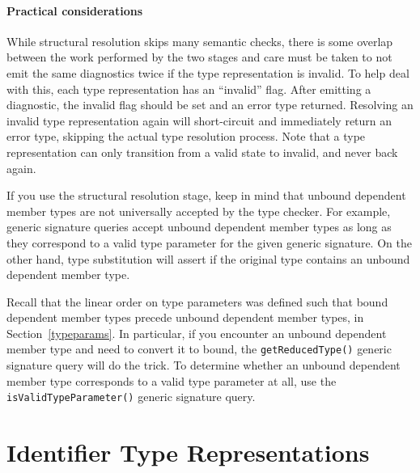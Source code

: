 \documentclass[../generics]{subfiles}
\begin{document}
\paragraph{Practical considerations}
While structural resolution skips many semantic checks, there is some overlap between the work performed by the two stages and care must be taken to not emit the same diagnostics twice if the type representation is invalid. To help deal with this, each type representation has an ``invalid'' flag. After emitting a diagnostic, the invalid flag should be set and an error type returned. Resolving an invalid type representation again will short-circuit and immediately return an error type, skipping the actual type resolution process. Note that a type representation can only transition from a valid state to invalid, and never back again.

If you use the structural resolution stage, keep in mind that unbound dependent member types are not universally accepted by the type checker. For example, generic signature queries accept unbound dependent member types as long as they correspond to a valid type parameter for the given generic signature. On the other hand, type substitution will assert if the original type contains an unbound dependent member type.

Recall that the linear order on type parameters was defined such that bound dependent member types precede unbound dependent member types, in Section~\ref{typeparams}. In particular, if you encounter an unbound dependent member type and need to convert it to bound, the \texttt{getReducedType()} generic signature query will do the trick. To determine whether an unbound dependent member type corresponds to a valid type parameter at all, use the \texttt{isValidTypeParameter()} generic signature query.

\section{Identifier Type Representations}\label{identtyperepr}
\end{document}
